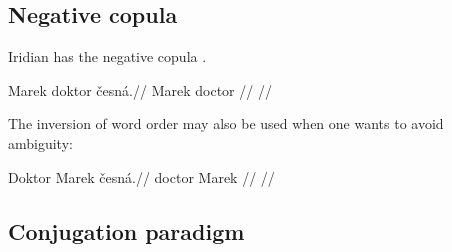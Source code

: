 \subsection{Negative copula}

Iridian has the negative copula .

\pex
\begingl
\gla Marek doktor česná.//
\glb Marek doctor //
\glft {}//
\endgl
\xe

\par The inversion of word order may also be used when one wants to avoid ambiguity:

\pex
\begingl
\gla Doktor Marek česná.//
\glb doctor Marek //
\glft {}//
\endgl
\xe


\subsection{Conjugation paradigm}
